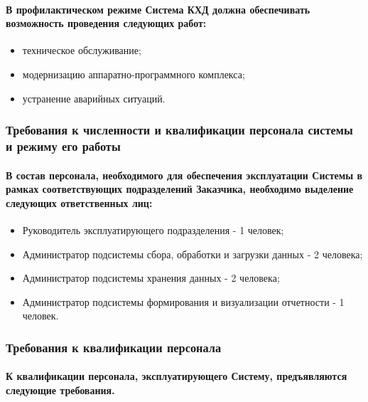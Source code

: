 \documentclass{article}
\begin{document}
        \paragraph{В профилактическом режиме Система КХД должна обеспечивать возможность проведения следующих работ:}
        \begin{itemize}
            \item техническое обслуживание;
            \item модернизацию аппаратно-программного комплекса;
            \item устранение аварийных ситуаций.
        \end{itemize}
    
    \subsubsection{Требования к численности и квалификации персонала системы и режиму его работы}
        \paragraph{В состав персонала, необходимого для обеспечения эксплуатации Системы в рамках соответствующих подразделений Заказчика, необходимо выделение следующих ответственных лиц:}
        \begin{itemize}
            \item Руководитель эксплуатирующего подразделения - 1 человек;
            \item Администратор подсистемы сбора, обработки и загрузки данных - 2 человека;
            \item Администратор подсистемы хранения данных - 2 человека;
            \item Администратор подсистемы формирования и визуализации отчетности - 1 человек.
        \end{itemize}
        
        \subsubsection{Требования к квалификации персонала}
            \paragraph{К квалификации персонала, эксплуатирующего Систему, предъявляются следующие требования.}
            
\end{document}
